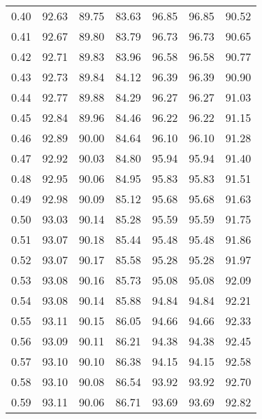 \begin{tabular}{|c|c|c|c|c|c|c|}
      0.40 &     92.63 &     89.75 &      83.63 &   96.85 &      96.85 &         90.52 \\
      0.41 &     92.67 &     89.80 &      83.79 &   96.73 &      96.73 &         90.65 \\
      0.42 &     92.71 &     89.83 &      83.96 &   96.58 &      96.58 &         90.77 \\
      0.43 &     92.73 &     89.84 &      84.12 &   96.39 &      96.39 &         90.90 \\
      0.44 &     92.77 &     89.88 &      84.29 &   96.27 &      96.27 &         91.03 \\
      0.45 &     92.84 &     89.96 &      84.46 &   96.22 &      96.22 &         91.15 \\
      0.46 &     92.89 &     90.00 &      84.64 &   96.10 &      96.10 &         91.28 \\
      0.47 &     92.92 &     90.03 &      84.80 &   95.94 &      95.94 &         91.40 \\
      0.48 &     92.95 &     90.06 &      84.95 &   95.83 &      95.83 &         91.51 \\
      0.49 &     92.98 &     90.09 &      85.12 &   95.68 &      95.68 &         91.63 \\
      0.50 &     93.03 &     90.14 &      85.28 &   95.59 &      95.59 &         91.75 \\
      0.51 &     93.07 &     90.18 &      85.44 &   95.48 &      95.48 &         91.86 \\
      0.52 &     93.07 &     90.17 &      85.58 &   95.28 &      95.28 &         91.97 \\
      0.53 &     93.08 &     90.16 &      85.73 &   95.08 &      95.08 &         92.09 \\
      0.54 &     93.08 &     90.14 &      85.88 &   94.84 &      94.84 &         92.21 \\
      0.55 &     93.11 &     90.15 &      86.05 &   94.66 &      94.66 &         92.33 \\
      0.56 &     93.09 &     90.11 &      86.21 &   94.38 &      94.38 &         92.45 \\
      0.57 &     93.10 &     90.10 &      86.38 &   94.15 &      94.15 &         92.58 \\
      0.58 &     93.10 &     90.08 &      86.54 &   93.92 &      93.92 &         92.70 \\
      0.59 &     93.11 &     90.06 &      86.71 &   93.69 &      93.69 &         92.82 \\

\end{tabular}
